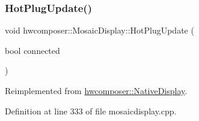 \subsubsection{\texorpdfstring{Hot\+Plug\+Update()}{HotPlugUpdate()}}
{\footnotesize\ttfamily void hwcomposer\+::\+Mosaic\+Display\+::\+Hot\+Plug\+Update (\begin{DoxyParamCaption}\item[{bool}]{connected }\end{DoxyParamCaption})\hspace{0.3cm}{\ttfamily [virtual]}}



Reimplemented from \mbox{\hyperlink{classhwcomposer_1_1NativeDisplay_a30e5c044e3a84ed23d2b3a5cec3f9037}{hwcomposer\+::\+Native\+Display}}.



Definition at line 333 of file mosaicdisplay.\+cpp.


